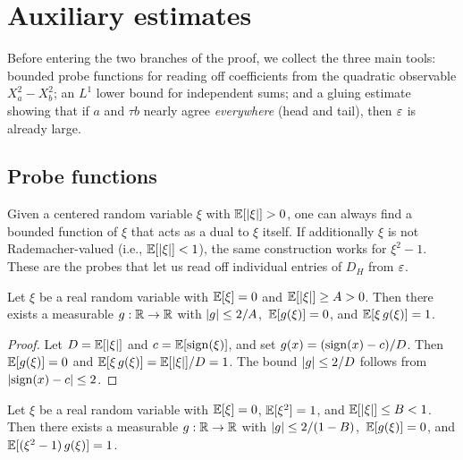 \section{Auxiliary estimates}\label{sec:auxiliary}

Before entering the two branches of the proof, we collect the three main
tools: bounded probe functions for reading off coefficients from the
quadratic observable $X_a^2 - X_b^2$; an $L^1$ lower bound for independent
sums; and a gluing estimate showing that if $a$ and $\tau b$ nearly agree
\emph{everywhere} (head and tail), then $\varepsilon$ is already large.

\subsection{Probe functions}\label{sec:probes}

Given a centered random variable $\xi$ with $\mathbb{E}[\lvert \xi \rvert] > 0$, one can
always find a bounded function of $\xi$ that acts as a dual to $\xi$ itself.
If additionally $\xi$ is not Rademacher-valued (i.e., $\mathbb{E}[\lvert \xi \rvert] < 1$),
the same construction works for $\xi^2 - 1$. These are the probes that let
us read off individual entries of $D_H$ from $\varepsilon$.

\begin{lemma}\label{lem:linear-probe}
Let $\xi$ be a real random variable with $\mathbb{E}[\xi] = 0$ and
$\mathbb{E}[\lvert \xi \rvert] \ge A > 0$. Then there exists a measurable
$g : \mathbb{R} \to \mathbb{R}$ with $\lvert g \rvert \le 2/A$,\, $\mathbb{E}[g(\xi)] = 0$, and
$\mathbb{E}[\xi \, g(\xi)] = 1$.
\end{lemma}

\begin{proof}
Let $D = \mathbb{E}[\lvert \xi \rvert]$ and $c = \mathbb{E}[\operatorname{sign}(\xi)]$, and set
$g(x) = (\operatorname{sign}(x) - c)/D$.
Then $\mathbb{E}[g(\xi)] = 0$ and
$\mathbb{E}[\xi \, g(\xi)] = \mathbb{E}[\lvert \xi \rvert]/D = 1$. The bound $\lvert g \rvert \le 2/D$
follows from $\lvert \operatorname{sign}(x) - c \rvert \le 2$.
\end{proof}

\begin{lemma}\label{lem:quadratic-probe}
Let $\xi$ be a real random variable with $\mathbb{E}[\xi] = 0$,
$\mathbb{E}[\xi^2] = 1$, and $\mathbb{E}[\lvert \xi \rvert] \le B < 1$. Then there exists a
measurable $g : \mathbb{R} \to \mathbb{R}$ with $\lvert g \rvert \le 2/(1-B)$,\,
$\mathbb{E}[g(\xi)] = 0$, and $\mathbb{E}[(\xi^2 - 1) \, g(\xi)] = 1$.
\end{lemma}

